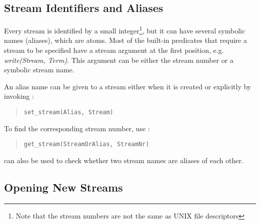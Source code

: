 \subsection{Stream Identifiers and Aliases}
Every stream is identified by a small integer\footnote{
Note that the stream numbers are not the same as UNIX file descriptors
}, but it can have several symbolic names (aliases), which are atoms.
Most of the built-in predicates that require a stream to be specified
have a stream argument at the first position,
e.g. {\it write(Stream, Term)}. This argument can be either the stream
number or a symbolic stream name.

An alias name can be given to a stream either when it is created or
explicitly by invoking
:
\begin{quote}\begin{verbatim}
set_stream(Alias, Stream)
\end{verbatim}\end{quote}
To find the corresponding stream number, use
:
\begin{quote}\begin{verbatim}
get_stream(StreamOrAlias, StreamNr)
\end{verbatim}\end{quote}
 can also
be used to check whether two stream names are aliases of each other.


\subsection{Opening New Streams}
\label{openstream}

